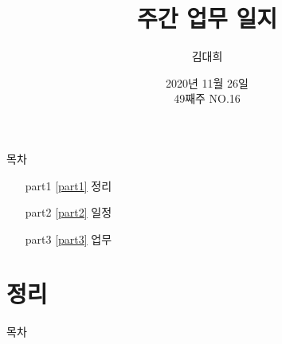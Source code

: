 \documentclass[aspectratio=1610,20pt,xcolor=pdftex,dvipsnames,table,handout]{beamer}
\begin{document}
	

			\title{ 주간 업무 일지 }
			\author{ 김대희 }
			\date{ 2020년 
						11월 
						26일\\ 
						49째주 
						NO.16  }


%
%
%


		\begin{frame}[plain]
		\titlepage
		\end{frame}


		\begin{frame} [plain]{목차}
		\tableofcontents%


			\setlength{\leftmargini}{ 2em}			
			\begin{itemize}

				\item [part1] \ref{part1}	정리
				\item [part2] \ref{part2}	일정
				\item [part3] \ref{part3}	업무

			\end{itemize}


		\end{frame}



		\part{정리 }
		\frame{\partpage}

\label{part1} 	%

		\begin{frame} [plain]{목차}
		\tableofcontents%
		\end{frame}
		

\end{document}
